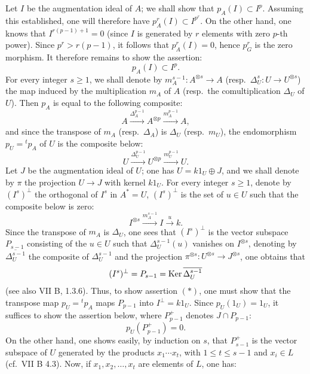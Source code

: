 Let $I$ be the augmentation ideal of $A$; we shall show that $p_A(I)\subset I^p$. Assuming this established, one will therefore have $p_A^r(I)\subset I^{p^r}$. On the other hand, one knows that $I^{r(p-1)+1}=0$ (since $I$ is generated by $r$ elements with zero $p$-th power). Since $p^r>r(p-1)$, it follows that $p_A^r(I)=0$, hence $p_G^r$ is the zero morphism. It therefore remains to show the assertion:
\begin{equation}\tag{$*$}p_A(I)\subset I^p.\end{equation}
For every integer $s\geq1$, we shall denote by $m_A^{s-1}:A^{\otimes s}\to A$ (resp.\ $\Delta_U^s:U\to U^{\otimes s}$) the map induced by the multiplication $m_A$ of $A$ (resp.\ the comultiplication $\Delta_U$ of $U$). Then $p_A$ is equal to the following composite:
\[
A\xrightarrow{\Delta_A^{p-1}}A^{\otimes p}\xrightarrow{m_A^{p-1}}A,
\]
and since the transpose of $m_A$ (resp.\ $\Delta_A$) is $\Delta_U$ (resp.\ $m_U$), the endomorphism $p_U={}^tp_A$ of $U$ is the composite below:
\[
U\xrightarrow{\Delta_U^{p-1}}U^{\otimes p}\xrightarrow{m_U^{p-1}}U.
\]
Let $J$ be the augmentation ideal of $U$; one has $U=k1_U\oplus J$, and we shall denote by $\pi$ the projection $U\to J$ with kernel $k1_U$. For every integer $s\geq1$, denote by $(I^s)^\perp$ the orthogonal of $I^s$ in $A^*=U$, \ie $(I^s)^\perp$ is the set of $u\in U$ such that the composite below is zero:
\[
I^{\otimes s}\xrightarrow{m_A^{s-1}}I\xrightarrow{u}k.
\]
Since the transpose of $m_A$ is $\Delta_U$, one sees that $(I^s)^\perp$ is the vector subspace $P_{s-1}$ consisting of the $u\in U$ such that $\Delta_U^{s-1}(u)$ vanishes on $I^{\otimes s}$, \ie denoting by $\overline{\Delta_U^{s-1}}$ the composite of $\Delta_U^{s-1}$ and the projection $\pi^{\otimes s}:U^{\otimes s}\to J^{\otimes s}$, one obtains that
\[
(I^s)^\perp=P_{s-1}=\operatorname{Ker}\overline{\Delta_U^{s-1}}
\]
(see also VII B, 1.3.6). Thus, to show assertion $(*)$, one must show that the transpose map $p_U={}^tp_A$ maps $P_{p-1}$ into $I^\perp=k1_U$. Since $p_U(1_U)=1_U$, it suffices to show the assertion below, where $P_{p-1}^+$ denotes $J\cap P_{p-1}$:
\begin{equation}\tag{$**$}p_U(P_{p-1}^+)=0.\end{equation}
On the other hand, one shows easily, by induction on $s$, that $P_{s-1}^+$ is the vector subspace of $U$ generated by the products $x_1\cdots x_t$, with $1\leq t\leq s-1$ and $x_i\in L$ (cf.\ VII B 4.3). Now, if $x_1,x_2,\ldots,x_t$ are elements of $L$, one has:
